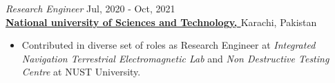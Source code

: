 \documentclass[margin, 10pt]{res} %
\begin{document}
\begin{resume}
\begin{itemize}
\begin{itemize}
    \end{itemize}
\end{itemize}



\emph{Research Engineer} \hfill {\small Jul, 2020 -  Oct, 2021} \\
\href{https://pnec.nust.edu.pk/}{\textbf{National university of Sciences and Technology, \href{https://pnec.nust.edu.pk/}{}}} Karachi, Pakistan
\begin{itemize}

\item Contributed in diverse set of roles as Research Engineer at \emph{Integrated Navigation Terrestrial Electromagnetic Lab} and \emph{Non Destructive Testing Centre} at NUST University.



\end{itemize}
\end{resume}
\end{document}
